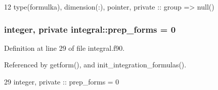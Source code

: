 \begin{DoxyCode}
12   \textcolor{keywordtype}{type}(formulka), \textcolor{keywordtype}{dimension(:)}, \textcolor{keywordtype}{pointer}, \textcolor{keywordtype}{private} :: group => null()
\end{DoxyCode}
\subsubsection[{prep\+\_\+forms}]{\setlength{\rightskip}{0pt plus 5cm}integer, private integral\+::prep\+\_\+forms = 0\hspace{0.3cm}{\ttfamily [private]}}\label{namespaceintegral_a50885313c2eb530ba1d15bfabb12a941}


Definition at line 29 of file integral.\+f90.



Referenced by getform(), and init\+\_\+integration\+\_\+formulas().


\begin{DoxyCode}
29   \textcolor{keywordtype}{integer}, \textcolor{keywordtype}{private} :: prep_forms = 0
\end{DoxyCode}
